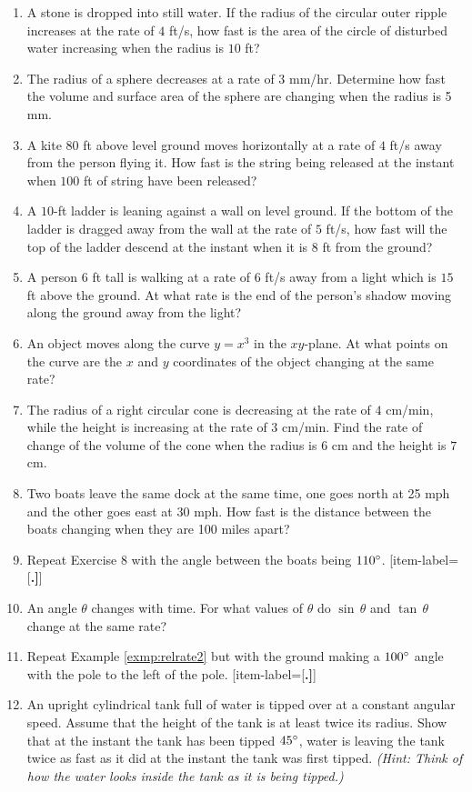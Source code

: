 \startexercises\label{sec3dot5}
{\small
{}
\begin{enumerate}[item-label={\bfseries \arabic*.}]
 \item A stone is dropped into still water. If the radius of the circular outer
  ripple increases at the rate of $4$ ft/s, how fast is the area of the circle
  of disturbed water increasing when the radius is $10$ ft?
 \item The radius of a sphere decreases at a rate of 3 mm/hr. Determine how fast
  the volume and surface area of the sphere are changing when the radius is 5 mm.
 \item A kite $80$ ft above level ground moves horizontally at a rate of
  $4$ ft/s away from the person flying it. How fast is the string being
  released at the instant when $100$ ft of string have been released?
 \item A $10$-ft ladder is leaning against a wall on level ground. If the
  bottom of the ladder is dragged away from the wall at the rate of $5$ ft/s,
  how fast will the top of the ladder descend at the instant when it is $8$ ft
  from the ground?
 \item A person $6$ ft tall is walking at a rate of $6$ ft/s away from a light
  which is $15$ ft above the ground. At what rate is the end of the person's
  shadow moving along the ground away from the light?
 \item An object moves along the curve $y = x^3$ in the $xy$-plane. At what
  points on the curve are the $x$ and $y$ coordinates of the object changing at
  the same rate?
 \item The radius of a right circular cone is decreasing at the rate of $4$
  cm/min, while the height is increasing at the rate of $3$ cm/min. Find the
  rate of change of the volume of the cone when the radius is $6$ cm and
  the height is $7$ cm.
 \item Two boats leave the same dock at the same time, one goes north at
  25 mph and the other goes east at 30 mph. How fast is the distance between
  the boats changing when they are 100 miles apart?
 \item Repeat Exercise 8 with the angle between the boats being $110^\circ$.
[item-label={{[\bfseries \arabic*.]}}]
 \item An angle $\theta$ changes with time. For what values of $\theta$
  do $\sin\,\theta$ and $\tan\,\theta$ change at the same rate?
 \item Repeat Example \ref{exmp:relrate2} but with the ground making a
  $100^\circ$ angle with the pole to the left of the pole.
[item-label={{[\bfseries \arabic*.]}}]
 \item An upright cylindrical tank full of water is tipped over at a
 constant angular speed. Assume that the height of the tank
 is at least twice its radius. Show that at the instant the tank has
 been tipped $45^\circ$, water is leaving the tank twice as fast as it did
 at the instant the tank was first tipped.
 \emph{(Hint: Think of how the water looks inside the tank as it is being tipped.)}
\end{enumerate}
}
\newpage
